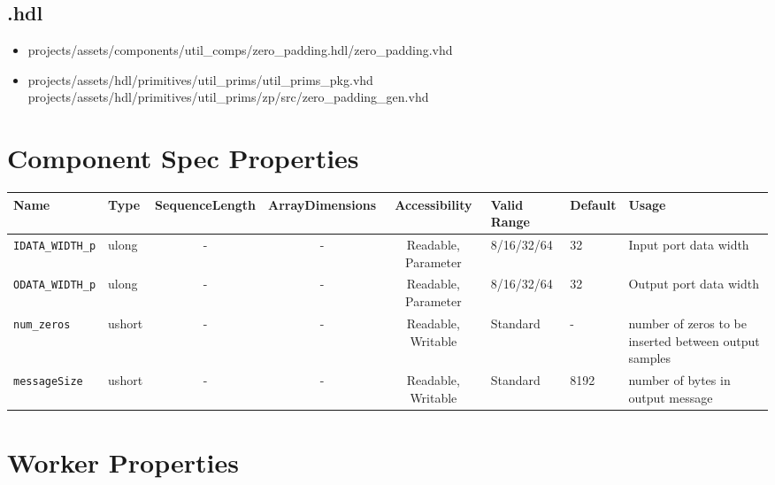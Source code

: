 \subsection*{\comp.hdl}
\begin{itemize}
	\item projects/assets/components/util\_comps/zero\_padding.hdl/zero\_padding.vhd
	\item projects/assets/hdl/primitives/util\_prims/util\_prims\_pkg.vhd
	      \subitem projects/assets/hdl/primitives/util\_prims/zp/src/zero\_padding\_gen.vhd
\end{itemize}

\begin{landscape}
	\section*{Component Spec Properties}
	\begin{scriptsize}
		\begin{tabular}{|p{2cm}|p{1.5cm}|c|c|c|p{1.5cm}|p{1cm}|p{7cm}|}
			\hline
			\rowcolor{blue}
			Name                 & Type   & SequenceLength & ArrayDimensions & Accessibility       & Valid Range & Default & Usage                                                 \\
			\hline
			\verb+IDATA_WIDTH_p+ & ulong  & -              & -               & Readable, Parameter & 8/16/32/64  & 32      & Input port data width                                 \\
			\hline
			\verb+ODATA_WIDTH_p+ & ulong  & -              & -               & Readable, Parameter & 8/16/32/64  & 32      & Output port data width                                \\
			\hline
			\verb+num_zeros+     & ushort & -              & -               & Readable, Writable  & Standard    & -       & number of zeros to be inserted between output samples \\
			\hline
			\verb+messageSize+   & ushort & -              & -               & Readable, Writable  & Standard    & 8192    & number of bytes in output message \\
			\hline
		\end{tabular}
	\end{scriptsize}

	\section*{Worker Properties}

\end{landscape}
